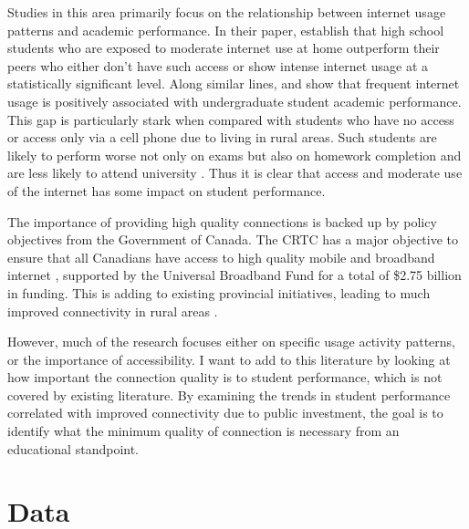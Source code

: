 \documentclass[12pt]{article}
\begin{document}
    Studies in this area primarily focus on the relationship between internet usage patterns and academic performance. In their paper,  establish that high school students who are exposed to moderate internet use at home outperform their peers who either don't have such access or show intense internet usage at a statistically significant level. Along similar lines,  and  show that frequent internet usage is positively associated with undergraduate student academic performance. This gap is particularly stark when compared with students who have no access or access only via a cell phone due to living in rural areas. Such students are likely to perform worse not only on exams but also on homework completion and are less likely to attend university \cite{hampton2020broadband}. Thus it is clear that access and moderate use of the internet has some impact on student performance. 
    
    The importance of providing high quality connections is backed up by policy objectives from the Government of Canada. The CRTC has a major objective to ensure that all Canadians have access to high quality mobile and broadband internet \cite{radio2020broadband}, supported by the Universal Broadband Fund for a total of \$2.75 billion in funding. This is adding to existing provincial initiatives, leading to much improved connectivity in rural areas \cite{rajabiun2013rural}.

    However, much of the research focuses either on specific usage activity patterns, or the importance of accessibility. I want to add to this literature by looking at how important the connection quality is to student performance, which is not covered by existing literature. By examining the trends in student performance correlated with improved connectivity due to public investment, the goal is to identify what the minimum quality of connection is necessary from an educational standpoint. 

    \section*{Data}
\end{document}
